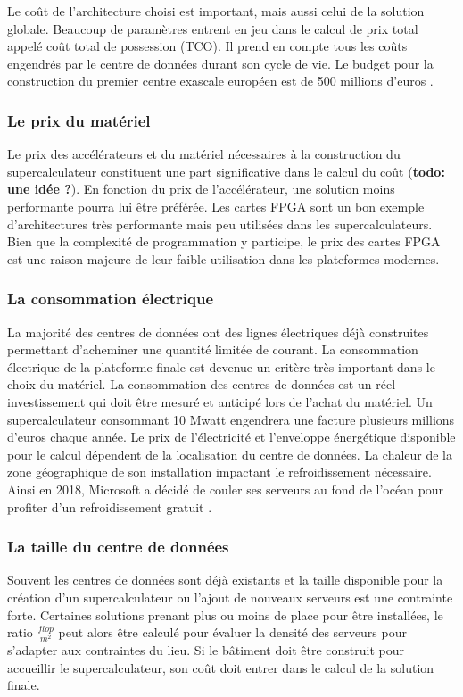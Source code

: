     Le coût de l'architecture choisi est important, mais aussi celui de la solution globale. Beaucoup de paramètres entrent en jeu dans le calcul de prix total appelé coût total de possession ($\text{TCO}$). Il prend en compte tous les coûts engendrés par le centre de données durant son cycle de vie. Le budget pour la construction du premier centre exascale européen est de 500 millions d'euros \cite{SergiGirona2018}.
    
    \subsubsection{Le prix du matériel} 
        Le  prix des accélérateurs et du matériel nécessaires à la construction du supercalculateur constituent une part significative dans le calcul du coût (\textbf{todo: une idée ?}). En fonction du prix de l'accélérateur, une solution moins performante pourra lui être préférée. Les cartes FPGA sont un bon exemple d'architectures très performante mais peu utilisées dans les supercalculateurs. Bien que la complexité de programmation y participe, le prix des cartes FPGA est une raison majeure de leur faible utilisation dans les plateformes modernes.
    
    \subsubsection{La consommation électrique}
        La majorité des centres de données ont des lignes électriques déjà construites permettant d’acheminer une quantité limitée de courant. La consommation électrique de la plateforme finale est devenue un critère très important dans le choix du matériel. La consommation des centres de données est un réel investissement qui doit être mesuré et anticipé lors de l'achat du matériel. Un supercalculateur consommant 10 Mwatt engendrera une facture plusieurs millions d'euros chaque année. Le prix de l'électricité et l'enveloppe énergétique disponible pour le calcul dépendent de la localisation du centre de données. La chaleur de la zone géographique de son installation impactant le refroidissement nécessaire. Ainsi en 2018, Microsoft a décidé de couler ses serveurs au fond de l'océan pour profiter d'un refroidissement gratuit \cite{ChristineHall2018}.
        
    \subsubsection{La taille du centre de données} 
        Souvent les centres de données sont déjà existants et la taille disponible pour la création d'un supercalculateur ou l'ajout de nouveaux serveurs est une contrainte forte. Certaines solutions prenant plus ou moins de place pour être installées, le ratio $\frac{flop}{m^2}$ peut alors être calculé pour évaluer la densité des serveurs pour s'adapter aux contraintes du lieu. Si le bâtiment doit être construit pour accueillir le supercalculateur, son coût doit entrer dans le calcul de la solution finale.




